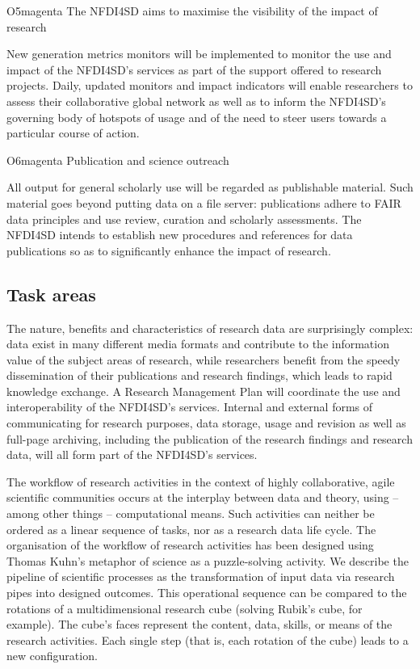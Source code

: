 \documentclass[
  english,
  paper=a4,
  oneside,captions=tableheading
]{scrbook}
\begin{document}
\begin{awesomeblock}[magenta]{1pt}{O5}{magenta} The NFDI4SD aims to maximise the visibility of the impact of research\end{awesomeblock}

New generation metrics monitors will be implemented to monitor the use
and impact of the NFDI4SD's services as part of the support offered to
research projects. Daily, updated monitors and impact indicators will
enable researchers to assess their collaborative global network as well
as to inform the NFDI4SD's governing body of hotspots of usage and of
the need to steer users towards a particular course of action.

\begin{awesomeblock}[magenta]{1pt}{O6}{magenta} Publication and science outreach\end{awesomeblock}

All output for general scholarly use will be regarded as publishable
material. Such material goes beyond putting data on a file server:
publications adhere to FAIR data principles and use review, curation and
scholarly assessments. The NFDI4SD intends to establish new procedures
and references for data publications so as to significantly enhance the
impact of research.

\hypertarget{task-areas}{%
\subsection{Task areas}\label{task-areas}}

The nature, benefits and characteristics of research data are
surprisingly complex: data exist in many different media formats and
contribute to the information value of the subject areas of research,
while researchers benefit from the speedy dissemination of their
publications and research findings, which leads to rapid knowledge
exchange. A Research Management Plan will coordinate the use and
interoperability of the NFDI4SD's services. Internal and external forms
of communicating for research purposes, data storage, usage and revision
as well as full-page archiving, including the publication of the
research findings and research data, will all form part of the NFDI4SD's
services.

The workflow of research activities in the context of highly
collaborative, agile scientific communities occurs at the interplay
between data and theory, using -- among other things -- computational
means. Such activities can neither be ordered as a linear sequence of
tasks, nor as a research data life cycle. The organisation of the
workflow of research activities has been designed using Thomas Kuhn's
metaphor of science as a puzzle-solving activity. We describe the
pipeline of scientific processes as the transformation of input data via
research pipes into designed outcomes. This operational sequence can be
compared to the rotations of a multidimensional research cube (solving
Rubik's cube, for example). The cube's faces represent the content,
data, skills, or means of the research activities. Each single step
(that is, each rotation of the cube) leads to a new configuration.
\end{document}
